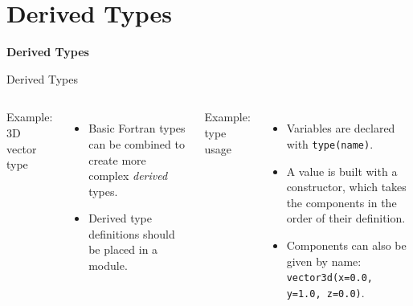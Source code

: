 
\subtitle{Lecture 6: Derived Types, Linked Lists, and Custom Operators}



\begin{frame}
  \titlepage
\end{frame}

\section{Derived Types}

\begin{frame}
	\centering
	\Huge \textbf{Derived Types}
\end{frame}

\begin{frame}[fragile]{Derived Types}

\begin{columns}[T]
  \begin{block}{Example: 3D vector type}
    
  \end{block}
  \begin{itemize}
  \item Basic Fortran types can be combined to create more complex \textit{derived} types.
  \item Derived type definitions should be placed in a module.
  \end{itemize}

  \begin{block}{Example: type usage}
  
  \end{block}
  \begin{itemize}
  \item Variables are declared with \texttt{type(name)}.
  \item A value is built with a constructor, which takes the components in the order of their definition.
  \item Components can also be given by name: \texttt{vector3d(x=0.0, y=1.0, z=0.0)}.
  \end{itemize}

\end{columns}
\end{frame}

